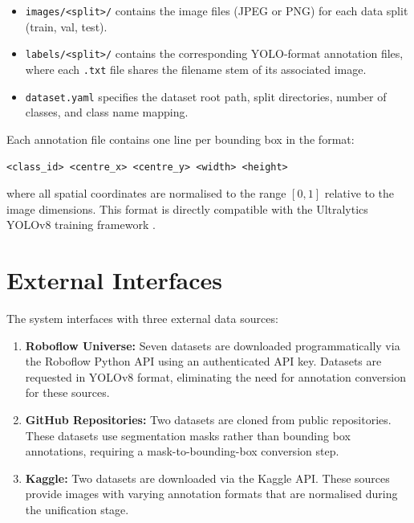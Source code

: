 \documentclass[a4paper,12pt,twoside]{report}
\begin{document}
\begin{itemize}
  \item \texttt{images/<split>/} contains the image files (JPEG or PNG) for each
    data split (train, val, test).
  \item \texttt{labels/<split>/} contains the corresponding YOLO-format
    annotation files, where each \texttt{.txt} file shares the filename stem of
    its associated image.
  \item \texttt{dataset.yaml} specifies the dataset root path, split
    directories, number of classes, and class name mapping.
\end{itemize}

Each annotation file contains one line per bounding box in the format:

\begin{center}
  \texttt{<class\_id> <centre\_x> <centre\_y> <width> <height>}
\end{center}

where all spatial coordinates are normalised to the range $[0, 1]$ relative to
the image dimensions. This format is directly compatible with the Ultralytics
YOLOv8 training framework \citep{jocher2023yolov8}.

\section{External Interfaces}
\label{sec:external-interfaces}

The system interfaces with three external data sources:

\begin{enumerate}
  \item \textbf{Roboflow Universe:} Seven datasets are downloaded
    programmatically via the Roboflow Python API using an authenticated API key.
    Datasets are requested in YOLOv8 format, eliminating the need for annotation
    conversion for these sources.

  \item \textbf{GitHub Repositories:} Two datasets are cloned from public
    repositories. These datasets use segmentation masks rather than bounding box
    annotations, requiring a mask-to-bounding-box conversion step.

  \item \textbf{Kaggle:} Two datasets are downloaded via the Kaggle API. These
    sources provide images with varying annotation formats that are normalised
    during the unification stage.
\end{enumerate}
\end{document}
